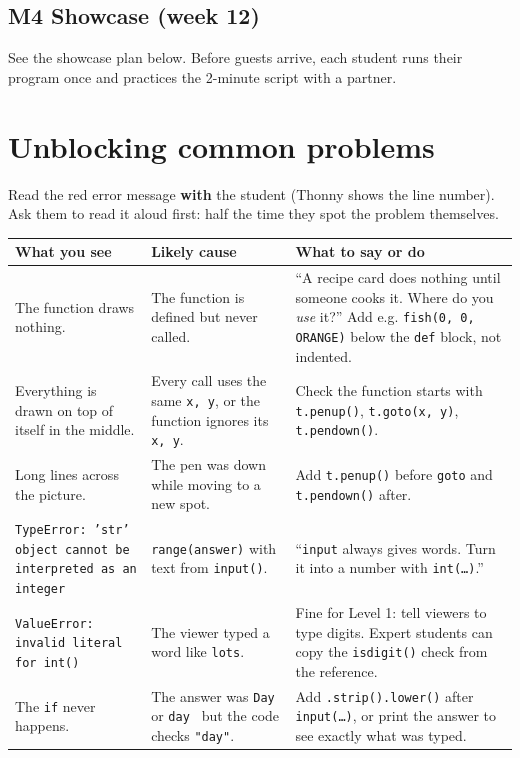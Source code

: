 \documentclass[level=1,teacher]{kidscode}
\begin{document}
\subsection{M4 Showcase (week 12)}
See the showcase plan below. Before guests arrive, each student runs their program once and practices
the 2-minute script with a partner.

\section{Unblocking common problems}
Read the red error message \textbf{with} the student (Thonny shows the line number). Ask them to read
it aloud first: half the time they spot the problem themselves.

{\small\renewcommand{\arraystretch}{1.3}
\begin{longtable}{@{}>{\RaggedRight}p{4.1cm}>{\RaggedRight}p{4.4cm}>{\RaggedRight\arraybackslash}p{\dimexpr\linewidth-8.5cm-4\tabcolsep}@{}}
\toprule
What you see & Likely cause & What to say or do\\
\midrule\endhead
\bottomrule\endfoot
The function draws nothing. & The function is defined but never called. & \enquote{A recipe card does nothing until someone cooks it. Where do you \emph{use} it?} Add e.g. \texttt{fish(0, 0, ORANGE)} below the \texttt{def} block, not indented.\\
\midrule
Everything is drawn on top of itself in the middle. & Every call uses the same \texttt{x, y}, or the function ignores its \texttt{x, y}. & Check the function starts with \texttt{t.penup()}, \texttt{t.goto(x, y)}, \texttt{t.pendown()}.\\
\midrule
Long lines across the picture. & The pen was down while moving to a new spot. & Add \texttt{t.penup()} before \texttt{goto} and \texttt{t.pendown()} after.\\
\midrule
\texttt{TypeError: 'str' object cannot be interpreted as an integer} & \texttt{range(answer)} with text from \texttt{input()}. & \enquote{\texttt{input} always gives words. Turn it into a number with \texttt{int(\dots)}.}\\
\midrule
\texttt{ValueError: invalid literal for int()} & The viewer typed a word like \texttt{lots}. & Fine for Level 1: tell viewers to type digits. Expert students can copy the \texttt{isdigit()} check from the reference.\\
\midrule
The \texttt{if} never happens. & The answer was \texttt{Day} or \texttt{day } but the code checks \texttt{"day"}. & Add \texttt{.strip().lower()} after \texttt{input(\dots)}, or print the answer to see exactly what was typed.\\

\end{longtable}}
\end{document}
